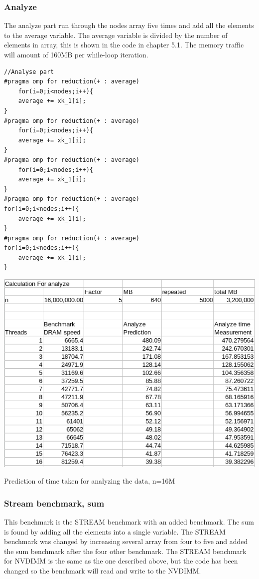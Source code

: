 \documentclass[12pt,a4paper,USenglish]{article}      %
\begin{document}
\subsubsection{Analyze}
The analyze part run through the nodes array five times and add all the elements to the average variable. The average variable is divided by the number of elements in array, this is shown in the code in chapter 5.1. The memory traffic will amount of 160MB per while-loop iteration.
\begin{lstlisting}[caption=Analyzing the data.]
//Analyse part
#pragma omp for reduction(+ : average)
	for(i=0;i<nodes;i++){
	average += xk_1[i];
}
#pragma omp for reduction(+ : average)
	for(i=0;i<nodes;i++){
	average += xk_1[i];
}
#pragma omp for reduction(+ : average)
	for(i=0;i<nodes;i++){
	average += xk_1[i];
}
#pragma omp for reduction(+ : average)
for(i=0;i<nodes;i++){
	average += xk_1[i];
}
#pragma omp for reduction(+ : average)
for(i=0;i<nodes;i++){
	average += xk_1[i];
}
\end{lstlisting}

\begin{table}[!hbtp]
\includegraphics[scale=0.7]{DRAM_only_Analyze_16M.png}
\caption{Prediction of time taken for analyzing the data, n=16M}
\end{table}

\clearpage
\subsubsection{Stream benchmark, sum}
This benchmark is the STREAM benchmark with an added benchmark. The sum is found by adding all the elements into a single variable. The STREAM benchmark was changed by increasing several array from four to five and added the sum benchmark after the four other benchmark. 
The STREAM benchmark for NVDIMM is the same as the one described above, but the code has been changed so the benchmark will read and write to the NVDIMM.
\end{document}
